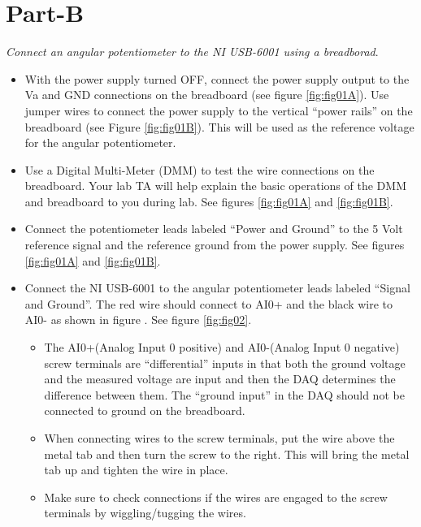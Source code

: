 \documentclass{article} %
\begin{document}
\section{Part-B}
\emph{Connect an angular potentiometer to the NI USB-6001 using a breadborad}.
\begin{itemize}
\item With the power supply turned OFF, connect the power supply output to the Va and GND connections on the breadboard (see figure \ref{fig:fig01A}). Use jumper wires to connect the power supply to the vertical “power rails” on the breadboard (see Figure \ref{fig:fig01B}). This will be used as the reference voltage for the angular potentiometer.  
\item Use a Digital Multi-Meter (DMM) to test the wire connections on the breadboard.  Your lab TA will help explain the basic operations of the DMM and breadboard to you during lab. See figures \ref{fig:fig01A} and \ref{fig:fig01B}.
\item Connect the potentiometer leads labeled “Power and Ground” to the 5 Volt reference signal and the reference ground from the power supply. See figures \ref{fig:fig01A} and \ref{fig:fig01B}.
\item Connect the NI USB-6001 to the angular potentiometer leads labeled “Signal and Ground”. The red wire should connect to AI0+ and the black wire to AI0- as shown in figure . See figure \ref{fig:fig02}.
\begin{itemize}
\item The AI0+(Analog Input 0 positive) and AI0-(Analog Input 0 negative) screw terminals are ``differential'' inputs in that both the ground voltage and the measured voltage are input and then the DAQ determines the difference between them. The ``ground input'' in the DAQ should not be connected to ground on the breadboard. 
\item When connecting wires to the screw terminals, put the wire above the metal tab and then turn the screw to the right. This will bring the metal tab up and tighten the wire in place.
\item Make sure to check connections if the wires are engaged to the screw terminals by wiggling/tugging the wires.
\end{itemize}
\end{itemize}
\end{document}
